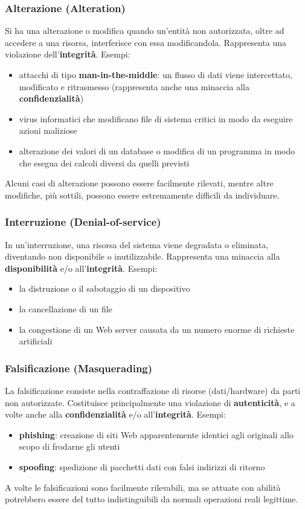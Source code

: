 \subsubsection{Alterazione (Alteration)}
Si ha una alterazione o modifica quando un'entità non autorizzata, oltre ad accedere a una risorsa, interferisce con essa modificandola. Rappresenta una violazione dell'\textbf{integrità}. Esempi:
\begin{itemize} 
  \item attacchi di tipo \textbf{man-in-the-middle}: un flusso di dati viene intercettato, modificato e ritrasmesso (rappresenta anche una minaccia alla \textbf{confidenzialità})
  \item virus informatici che modificano file di sistema critici in modo da eseguire azioni maliziose
  \item alterazione dei valori di un database o modifica di un programma in modo che esegua dei calcoli diversi da quelli previsti
\end{itemize}
Alcuni casi di alterazione possono essere facilmente rilevati, mentre altre modifiche, più sottili, possono essere estremamente difficili da individuare.

\subsubsection{Interruzione (Denial-of-service)}
In un'interruzione, una risorsa del sistema viene degradata o eliminata, diventando non disponibile o inutilizzabile. Rappresenta una minaccia alla \textbf{disponibilità} e/o all'\textbf{integrità}. Esempi:
\begin{itemize} 
  \item la distruzione o il sabotaggio di un dispositivo
  \item la cancellazione di un file
  \item la congestione di un Web server causata da un numero enorme di richieste artificiali
\end{itemize}

\subsubsection{Falsificazione (Masquerading)}
La falsificazione consiste nella contraffazione di risorse (dati/hardware) da parti non autorizzate. Costituisce principalmente una violazione di \textbf{autenticità}, e a volte anche alla \textbf{confidenzialità} e/o all'\textbf{integrità}. Esempi:
\begin{itemize} 
  \item \textbf{phishing}: creazione di siti Web apparentemente identici agli originali allo scopo di frodarne gli utenti
  \item \textbf{spoofing}: spedizione di pacchetti dati con falsi indirizzi di ritorno
\end{itemize}
A volte le falsificazioni sono facilmente rilevabili, ma se attuate con abilità potrebbero essere del tutto indistinguibili da normali operazioni reali legittime.

